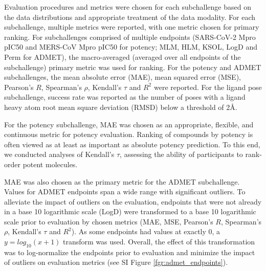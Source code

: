 \documentclass[journal=jcim,manuscript=article]{achemso}
\begin{document}
Evaluation procedures and metrics were chosen for each subchallenge based on the data distributions and appropriate treatment of the data modality. For each subchallenge, multiple metrics were reported, with one metric chosen for primary ranking. For subchallenges comprised of multiple endpoints (SARS-CoV-2 Mpro pIC50 and MERS-CoV Mpro pIC50 for potency; MLM, HLM, KSOL, LogD and Perm for ADMET), the macro-averaged (averaged over all endpoints of the subchallenge) primary metric was used for ranking. For the potency and ADMET subchallenges, the mean absolute error (MAE), mean squared error (MSE), Pearson's $R$, Spearman's $\rho$, Kendall's $\tau$ and $R^2$ were reported. For the ligand pose subchallenge, success rate was reported as the number of poses with a ligand heavy atom root mean square deviation (RMSD) below a threshold of 2Å.

For the potency subchallenge, MAE was chosen as an appropriate, flexible, and continuous metric for potency evaluation. Ranking of compounds by potency is often viewed as at least as important as absolute potency prediction\cite{parks_gaieb_chiu_yang_shao_walters_jansen_mcgaughey_lewis_bembenek_et}. To this end, we conducted analyses of Kendall's $\tau$, assessing the ability of participants to rank-order potent molecules. 

 MAE was also chosen as the primary metric for the ADMET subchallenge. Values for ADMET endpoints span a wide range with significant outliers. To alleviate the impact of outliers on the evaluation, endpoints that were not already in a base 10 logarithmic scale (LogD) were transformed to a base 10 logarithmic scale prior to evaluation by chosen metrics (MAE, MSE, Pearson's $R$, Spearman's $\rho$, Kendall's $\tau$ and $R^2$). As some endpoints had values at exactly 0, a $ y=log_{10}(x + 1)$ transform was used. Overall, the effect of this transformation was to log-normalize the endpoints prior to evaluation and minimize the impact of outliers on evaluation metrics (see SI Figure \ref{fgr:admet_endpoints}).
\end{document}
